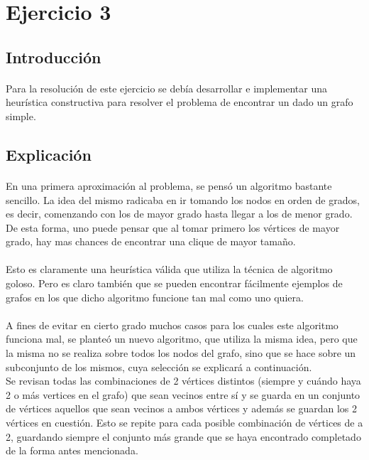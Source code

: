 \section{Ejercicio 3}

\subsection{Introducción}

\paragraph{}
Para la resolución de este ejercicio se debía desarrollar e implementar una heurística constructiva  para resolver el problema de encontrar un \mc dado un grafo simple.


\subsection{Explicación}

\paragraph{}
En una primera aproximación al problema, se pensó un algoritmo bastante sencillo. La idea del mismo radicaba en ir tomando los nodos en orden de grados, es decir, comenzando con los de mayor grado hasta llegar a los de menor grado. De esta forma, uno puede pensar que al tomar primero los vértices de mayor grado, hay mas chances de encontrar una clique de mayor tamaño.

\paragraph{}
Esto es claramente una heurística válida que utiliza la técnica de algoritmo goloso. Pero es claro también que se pueden encontrar fácilmente ejemplos de grafos en los que dicho algoritmo funcione tan mal como uno quiera.

\paragraph{}
A fines de evitar en cierto grado muchos casos para los cuales este algoritmo funciona mal, se planteó un nuevo algoritmo, que utiliza la misma idea, pero que la misma no se realiza sobre todos los nodos del grafo, sino que se hace sobre un subconjunto de los mismos, cuya selección se explicará a continuación.\\
Se revisan todas las combinaciones de 2 vértices distintos (siempre y cuándo haya 2 o más vertices en el grafo) que sean vecinos entre sí y se guarda en un conjunto de vértices aquellos que sean vecinos a ambos vértices y además se guardan los 2 vértices en cuestión. Esto se repite para cada posible combinación de vértices de a 2, guardando siempre el conjunto más grande que se haya encontrado completado de la forma antes mencionada.

